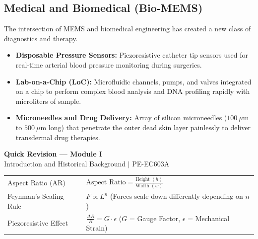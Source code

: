 \documentclass[12pt,a4paper]{article}
\renewcommand{\arraystretch}{1.45}
\begin{document}
\subsection{Medical and Biomedical (Bio-MEMS)}
The intersection of MEMS and biomedical engineering has created a new class of diagnostics and therapy.
\begin{itemize}[leftmargin=*, itemsep=3pt]
  \item \textbf{Disposable Pressure Sensors:} Piezoresistive catheter tip sensors used for real-time arterial blood pressure monitoring during surgeries.
  \item \textbf{Lab-on-a-Chip (LoC):} Microfluidic channels, pumps, and valves integrated on a chip to perform complex blood analysis and DNA profiling rapidly with microliters of sample.
  \item \textbf{Microneedles and Drug Delivery:} Array of silicon microneedles ($100\ \mu\text{m}$ to $500\ \mu\text{m}$ long) that penetrate the outer dead skin layer painlessly to deliver transdermal drug therapies.
\end{itemize}

\newpage
\begin{center}
  {\large\bfseries\color{myred} Quick Revision --- Module I}\\[3pt]
  {\small\color{mydark} Introduction and Historical Background $|$ PE-EC603A}
\end{center}
\noindent{\color{myred}\rule{\linewidth}{1.2pt}}
\vspace{4pt}

\begin{tcolorbox}[formulabox, title={\textbf{Key Concepts and Parameters}}]
\renewcommand{\arraystretch}{1.3}
\begin{tabularx}{\linewidth}{B{3.8cm} X}
Aspect Ratio (AR)        & $\text{Aspect Ratio} = \displaystyle\frac{\text{Height } (h)}{\text{Width } (w)}$ \\[8pt]
Feynman's Scaling Rule   & $F \propto L^n$ \quad (Forces scale down differently depending on $n$) \\[4pt]
Piezoresistive Effect    & $\displaystyle\frac{\Delta R}{R} = G \cdot \epsilon$ \quad ($G$ = Gauge Factor, $\epsilon$ = Mechanical Strain)
\end{tabularx}
\end{tcolorbox}
\end{document}
